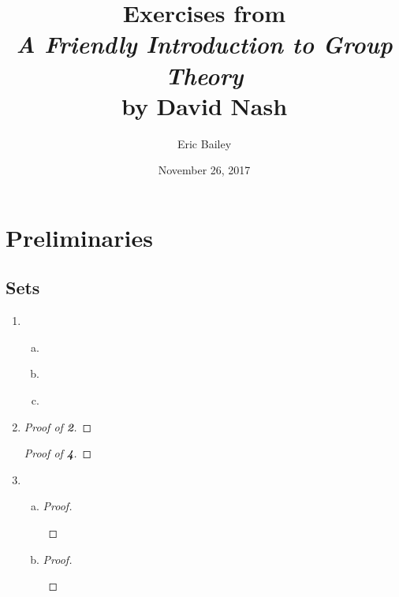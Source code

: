 \documentclass[12pt]{amsart}
\title{%
  Exercises from \\
  {\sl A Friendly Introduction to Group Theory} \\
  by David Nash%
}
\author{Eric Bailey}
\date{November 26, 2017}
\def\Circled#1{{\Large \textcircled{\small \bf #1}}}
\def\exercise#1#2{%
  \inputminted{gap}{gap/#1/#2.g}%
  \inputminted{gap}{answer/#1/#2.txt}%
}
\def\inputproof#1#2{%
  \begin{proof}[Proof of \Circled{#2}]
    
  \end{proof}%
}
\begin{document}
\maketitle
\tableofcontents
\newpage

\section{Preliminaries}

\subsection{Sets}

\begin{enumerate}[{\bf 1.}]
\item
  \begin{enumerate}[(a)]
  \item \exercise{1.1}{1a} \newpage
  \item \exercise{1.1}{1b}
  \item \exercise{1.1}{1c}
  \end{enumerate} \newpage

\item
  \begin{sideways}
    \begin{minipage}{\textheight}
      \inputproof{1.1}{2}
      \inputproof{1.1}{4}
    \end{minipage}
  \end{sideways}
\item
  \begin{enumerate}[(a)]
  \item
    \begin{proof}
      \begin{prooftree*}


      \end{prooftree*}
    \end{proof}
  \item
    \begin{proof}
      \begin{prooftree*}


\end{prooftree*}
\end{proof}
\end{enumerate}
\end{enumerate}
\end{document}
